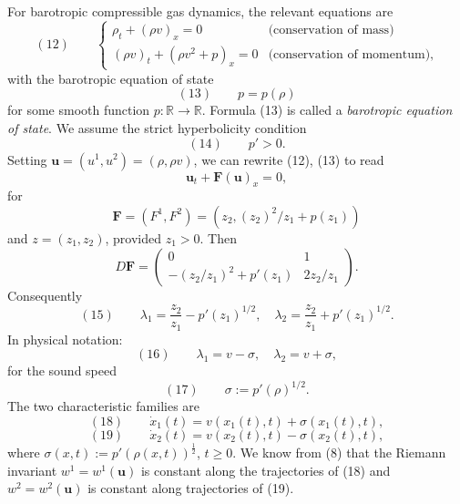 \begin{example}
\label{ex:barotropic-gas-dynamics-riemann-invariants}

For barotropic compressible gas dynamics, the relevant equations are
$$(12) \qquad \begin{cases} \rho_t + (\rho v)_x = 0 & \text{(conservation of mass)} \\ (\rho v)_t + (\rho v^2+p)_x = 0 & \text{(conservation of momentum)}, \end{cases}$$
with the barotropic equation of state
$$(13) \qquad p = p(\rho)$$
for some smooth function $p:\mathbb{R}\to\mathbb{R}$. Formula (13) is called a \textit{barotropic equation of state}. We assume the strict hyperbolicity condition
$$(14) \qquad p' > 0.$$
Setting $\mathbf{u}=(u^1,u^2)=(\rho,\rho v)$, we can rewrite (12), (13) to read
$$\mathbf{u}_t + \mathbf{F}(\mathbf{u})_x = 0,$$
for
$$\mathbf{F} = (F^1,F^2) = (z_2, (z_2)^2/z_1 + p(z_1))$$
and $z=(z_1,z_2)$, provided $z_1>0$. Then
$$D\mathbf{F} = \begin{pmatrix} 0 & 1 \\ -(z_2/z_1)^2 + p'(z_1) & 2z_2/z_1 \end{pmatrix}.$$
Consequently
$$(15) \qquad \lambda_1 = \frac{z_2}{z_1} - p'(z_1)^{1/2}, \quad \lambda_2 = \frac{z_2}{z_1} + p'(z_1)^{1/2}.$$
In physical notation:
$$(16) \qquad \lambda_1 = v-\sigma, \quad \lambda_2 = v+\sigma,$$
for the sound speed
$$(17) \qquad \sigma := p'(\rho)^{1/2}.$$
The two characteristic families are
$$(18) \qquad \dot x_1(t) = v(x_1(t),t) + \sigma(x_1(t),t),$$
$$(19) \qquad \dot x_2(t) = v(x_2(t),t) - \sigma(x_2(t),t),$$
where $\sigma(x,t) := p'(\rho(x,t))^{\frac12}$, $t\geq 0$. We know from (8) that the Riemann invariant $w^1=w^1(\mathbf{u})$ is constant along the trajectories of (18) and $w^2=w^2(\mathbf{u})$ is constant along trajectories of (19).


\end{example}

